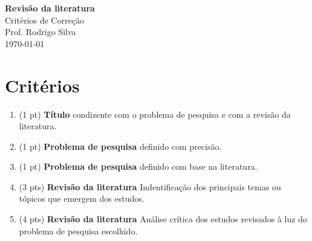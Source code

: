\documentclass[12pt,a4paper, brazil]{article}
\begin{document}
\begin{center}
{\textbf {\huge Revisão da literatura}}\\[5mm]
{\large Critérios de Correção } \\[2mm]
{\large Prof. Rodrigo Silva } \\[5mm]
\today\\[5mm] %
\end{center}



\section*{Critérios}

\begin{enumerate}
    \item (1 pt) \textbf{Título} condizente com o problema de pesquisa e com a revisão da literatura.
    \item (1 pt) \textbf{Problema de pesquisa} definido com precisão.
    \item (1 pt) \textbf{Problema de pesquisa} definido com base na literatura.
    \item (3 pts) \textbf{Revisão da literatura} Indentificação dos principais temas ou tópicos que emergem dos estudos.
    \item (4 pts) \textbf{Revisão da literatura} Análise crítica dos estudos revisados à luz do problema de pesquisa escolhido.
\end{enumerate}


    


\printbibliography
\end{document}

